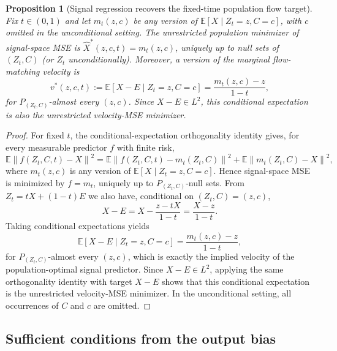 \documentclass{article}
\theoremstyle{plain}
\newtheorem{proposition}[theorem]{Proposition}
\theoremstyle{definition}
\theoremstyle{remark}
\newcommand{\Ex}{\mathbb{E}}
\newcommand{\norm}[1]{\left\lVert #1\right\rVert}
\begin{document}
\begin{proposition}[Signal regression recovers the fixed-time population flow target]
\label{prop:flow_target}
Fix $t\in(0,1)$ and let $m_t(z,c)$ be any version of $\Ex[X\mid Z_t=z,C=c]$, with $c$ omitted in the unconditional setting. The unrestricted population minimizer of signal-space MSE is $\hat X^*(z,c,t)=m_t(z,c)$, uniquely up to null sets of $(Z_t,C)$ (or $Z_t$ unconditionally). Moreover, a version of the marginal flow-matching velocity is
\begin{equation}
v^*(z,c,t):=\Ex[X-E\mid Z_t=z,C=c]
=\frac{m_t(z,c)-z}{1-t},
\label{eq:population_flow_target}
\end{equation}
for $P_{(Z_t,C)}$-almost every $(z,c)$. Since $X-E\in L^2$, this conditional expectation is also the unrestricted velocity-MSE minimizer.
\end{proposition}

\begin{proof}
For fixed $t$, the conditional-expectation orthogonality identity gives, for every measurable predictor $f$ with finite risk,
\begin{equation}
\Ex\norm{f(Z_t,C,t)-X}^2
=\Ex\norm{f(Z_t,C,t)-m_t(Z_t,C)}^2
+\Ex\norm{m_t(Z_t,C)-X}^2,
\end{equation}
where $m_t(z,c)$ is any version of $\Ex[X\mid Z_t=z,C=c]$. Hence signal-space MSE is minimized by $f=m_t$, uniquely up to $P_{(Z_t,C)}$-null sets. From $Z_t=tX+(1-t)E$ we also have, conditional on $(Z_t,C)=(z,c)$,
\begin{equation}
X-E=X-\frac{z-tX}{1-t}=\frac{X-z}{1-t}.
\end{equation}
Taking conditional expectations yields
\begin{equation}
\Ex[X-E\mid Z_t=z,C=c]=\frac{m_t(z,c)-z}{1-t},
\end{equation}
for $P_{(Z_t,C)}$-almost every $(z,c)$, which is exactly the implied velocity of the population-optimal signal predictor. Since $X-E\in L^2$, applying the same orthogonality identity with target $X-E$ shows that this conditional expectation is the unrestricted velocity-MSE minimizer. In the unconditional setting, all occurrences of $C$ and $c$ are omitted.
\end{proof}

\subsection{Sufficient conditions from the output bias}
\label{app:init_head_conditions}
\end{document}
